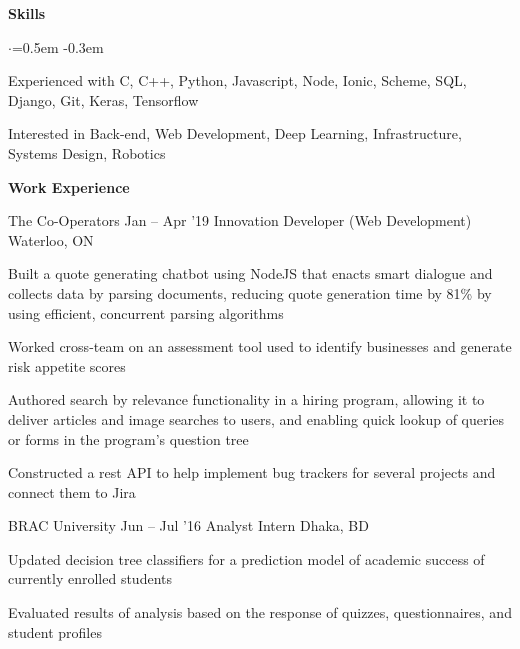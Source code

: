 \documentclass{resume} %
\begin{document}

\begin{rSection}{\textbf{Skills}}
  \vspace {0.3em}
  \begin{list}{$\cdot$}{\leftmargin=0.5em}
    \itemsep -0.3em \vspace{-0.3em}
    \item Experienced with C, C++, Python, Javascript, Node, Ionic, Scheme, SQL, Django, Git, Keras, Tensorflow
    \item Interested in Back-end, Web Development, Deep Learning, Infrastructure, Systems Design, Robotics
  \end{list}
  \vspace{0.3em}
\end{rSection}


\begin{rSection}{\textbf{Work Experience}}
  \begin{rSubsection}{The Co-Operators}
    {Jan -- Apr '19}
         {Innovation Developer (Web Development)}
         {Waterloo, ON}
       \item Built a quote generating chatbot using NodeJS that enacts smart dialogue and collects data by parsing documents, reducing quote generation time by 81\% by using efficient, concurrent parsing algorithms
       \item Worked cross{-}team on an assessment tool used to identify businesses and generate risk appetite scores
       \item Authored search by relevance functionality in a hiring program, allowing it to deliver articles and image searches to users, and enabling quick lookup of queries or forms in the program's question tree
     \item Constructed a rest API to help implement bug trackers for several projects and connect them to Jira
  \end{rSubsection}

	\begin{rSubsection}{BRAC University}
		{Jun -- Jul '16}
		{Analyst Intern}
		{Dhaka, BD}
		\item Updated decision tree classifiers for a prediction model of academic success of currently enrolled students
		\item Evaluated results of analysis based on the response of quizzes, questionnaires, and student profiles

	\end{rSubsection}
  
\end{rSection} 
\end{document}
